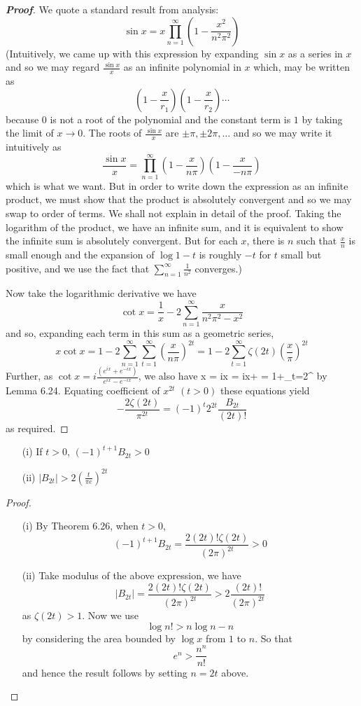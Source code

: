 \begin{proof}[\bf Proof] We quote a standard result from analysis:
$$\sin{x}=x\prod_{n=1}^\infty \left(1-\frac{x^2}{n^2 \pi^2}\right)$$
(Intuitively, we came up with this expression by expanding $\sin{x}$ as a series in $x$ and so
we may regard $\frac{\sin{x}}{x}$ as an infinite polynomial in $x$ which, may be written as
$$\left(1-\frac{x}{r_1}\right)\left(1-\frac{x}{r_2}\right) \cdots$$
because $0$ is not a root of the polynomial and the constant term is $1$ by taking the limit of $x \to 0$. The roots of $\frac{\sin{x}}{x}$ are $\pm \pi, \pm 2\pi, \ldots$ and so we may write it intuitively as
$$\frac{\sin{x}}{x}=\prod_{n=1}^\infty \left(1-\frac{x}{n \pi}\right)\left(1-\frac{x}{-n \pi}\right)$$
which is what we want. But in order to write down the expression as an infinite product, we must show that the product is absolutely convergent and so we may swap to order of terms. We shall not explain in detail of the proof. Taking the logarithm of the product, we have an infinite sum, and it is equivalent to show the infinite sum is absolutely convergent. But for each $x$, there is $n$ such that
$\frac{x}{n}$ is small enough and the expansion of $\log{1-t}$ is roughly $-t$ for $t$ small but positive, and we use the fact that $\sum_{n=1}^\infty \frac{1}{n^2}$ converges.)

Now take the logarithmic derivative we have
$$\cot{x}=\frac{1}{x}-2\sum_{n=1}^\infty \frac{x}{n^2\pi^2-x^2}$$
and so, expanding each term in this sum as a geometric series,
$$x\cot{x}=1-2\sum_{n=1}^\infty \sum_{t=1}^\infty \left(\frac{x}{n\pi}\right)^{2t}
=1-2\sum_{t=1}^\infty\zeta(2t)\left(\frac{x}{\pi}\right)^{2t}$$
Further, as $\cot{x}=i\frac{(e^{ix}+e^{-ix})}{e^{ix}-e^{-ix}}$, we also have
\be
x = ix  = ix+ = 1+\sum_{t=2}^\infty {}
\ee
by Lemma 6.24. Equating coefficient of $x^{2t}$ $(t>0)$ these equations yield
$$-\frac{2\zeta(2t)}{\pi^{2t}}=\left(-1\right)^t 2^{2t}\frac{B_{2t}}{(2t)!}$$
as required.
\end{proof}
\begin{corollary}
\begin{enumerate}
\item[(i)] If $t>0$, $(-1)^{t+1}B_{2t} >0$
\item[(ii)] $|B_{2t}|>2(\frac{t}{\pi e})^{2t}$
\end{enumerate}
\end{corollary}
\begin{proof}
\begin{enumerate}
\item[(i)] By Theorem 6.26, when $t>0$,
$$(-1)^{t+1}B_{2t}=\frac{2(2t)!\zeta(2t)}{(2\pi)^{2t}}>0$$
\item[(ii)] Take modulus of the above expression, we have
$$|B_{2t}|=\frac{2(2t)!\zeta(2t)}{(2\pi)^{2t}}>2\frac{(2t)!}{(2\pi)^{2t}}$$
as $\zeta(2t)>1$. Now we use
$$\log{n!} > n\log{n}-n$$ by considering the area bounded by $\log{x}$ from $1$ to $n$.
So that
$$e^{n}>\frac{n^n}{n!}$$
and hence the result follows by setting $n=2t$ above.
\end{enumerate}
\end{proof}
